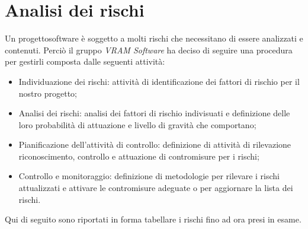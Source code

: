 \section{Analisi dei rischi}

Un progetto\glosp software è soggetto a molti rischi che necessitano di essere analizzati e contenuti. Perciò il gruppo \textit{VRAM Software} ha deciso di seguire una procedura per gestirli composta dalle seguenti attività:

\begin{itemize}
	\item Individuazione dei rischi: attività di identificazione dei fattori di rischio per il nostro progetto\glosp;
	\item Analisi dei rischi: analisi dei fattori di rischio indivisuati e definizione delle loro probabilità di attuazione e livello di gravità che comportano;
	\item Pianificazione dell'attività di controllo: definizione di attività di rilevazione riconoscimento, controllo e attuazione di contromisure per i rischi;
	\item Controllo e monitoraggio: definizione di metodologie per rilevare i rischi attualizzati e attivare le contromisure adeguate o per aggiornare la lista dei rischi.
\end{itemize}

Qui di seguito sono riportati in forma tabellare i rischi fino ad ora presi in esame.

